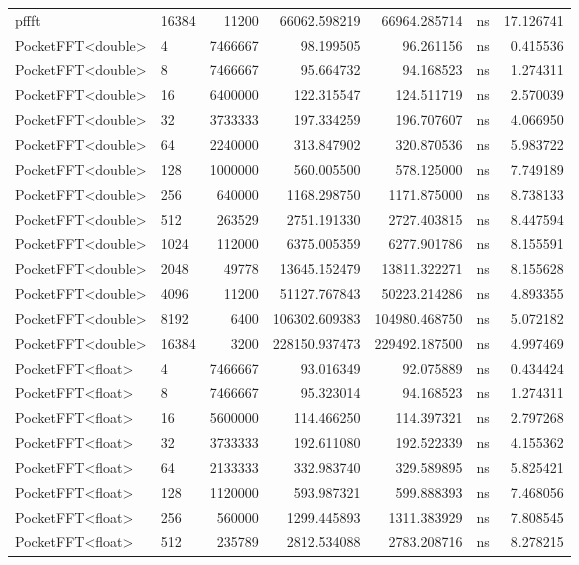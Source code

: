 \begin{tabular}{llrrrlr}
pffft & 16384 & 11200 & 66062.598219 & 66964.285714 & ns & 17.126741 \\
PocketFFT<double> & 4 & 7466667 & 98.199505 & 96.261156 & ns & 0.415536 \\
PocketFFT<double> & 8 & 7466667 & 95.664732 & 94.168523 & ns & 1.274311 \\
PocketFFT<double> & 16 & 6400000 & 122.315547 & 124.511719 & ns & 2.570039 \\
PocketFFT<double> & 32 & 3733333 & 197.334259 & 196.707607 & ns & 4.066950 \\
PocketFFT<double> & 64 & 2240000 & 313.847902 & 320.870536 & ns & 5.983722 \\
PocketFFT<double> & 128 & 1000000 & 560.005500 & 578.125000 & ns & 7.749189 \\
PocketFFT<double> & 256 & 640000 & 1168.298750 & 1171.875000 & ns & 8.738133 \\
PocketFFT<double> & 512 & 263529 & 2751.191330 & 2727.403815 & ns & 8.447594 \\
PocketFFT<double> & 1024 & 112000 & 6375.005359 & 6277.901786 & ns & 8.155591 \\
PocketFFT<double> & 2048 & 49778 & 13645.152479 & 13811.322271 & ns & 8.155628 \\
PocketFFT<double> & 4096 & 11200 & 51127.767843 & 50223.214286 & ns & 4.893355 \\
PocketFFT<double> & 8192 & 6400 & 106302.609383 & 104980.468750 & ns & 5.072182 \\
PocketFFT<double> & 16384 & 3200 & 228150.937473 & 229492.187500 & ns & 4.997469 \\
PocketFFT<float> & 4 & 7466667 & 93.016349 & 92.075889 & ns & 0.434424 \\
PocketFFT<float> & 8 & 7466667 & 95.323014 & 94.168523 & ns & 1.274311 \\
PocketFFT<float> & 16 & 5600000 & 114.466250 & 114.397321 & ns & 2.797268 \\
PocketFFT<float> & 32 & 3733333 & 192.611080 & 192.522339 & ns & 4.155362 \\
PocketFFT<float> & 64 & 2133333 & 332.983740 & 329.589895 & ns & 5.825421 \\
PocketFFT<float> & 128 & 1120000 & 593.987321 & 599.888393 & ns & 7.468056 \\
PocketFFT<float> & 256 & 560000 & 1299.445893 & 1311.383929 & ns & 7.808545 \\
PocketFFT<float> & 512 & 235789 & 2812.534088 & 2783.208716 & ns & 8.278215 \\

\end{tabular}
